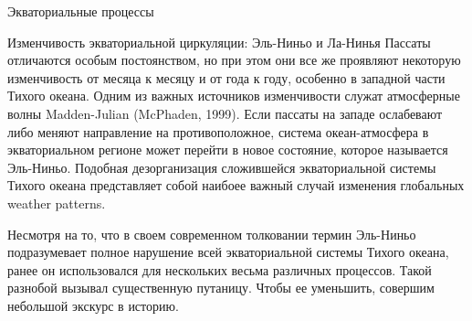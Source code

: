 \begin{chapter}{Экваториальные процессы}
\begin{section}{Изменчивость экваториальной циркуляции: Эль-Ниньо и Ла-Нинья}
%
%
Пассаты отличаются особым постоянством, но при этом они все же проявляют
некоторую изменчивость от месяца к месяцу и от года к году, особенно в западной
части Тихого океана. Одним из важных источников изменчивости служат атмосферные 
волны Madden-Julian (McPhaden, 1999). Если пассаты на западе ослабевают либо
меняют направление на противоположное, система океан-атмосфера в 
экваториальном регионе может перейти в новое состояние, которое называется
Эль-Ниньо. Подобная дезорганизация сложившейся экваториальной системы Тихого 
океана представляет собой наибоее важный случай изменения глобальных
weather patterns.
%

Несмотря на то, что в своем современном толковании термин Эль-Ниньо 
подразумевает полное нарушение всей экваториальной системы Тихого океана, 
ранее он использовался для нескольких весьма различных процессов. Такой
разнобой вызывал существенную путаницу. Чтобы ее уменьшить, совершим 
небольшой экскурс в историю.
%


\end{section}
\end{chapter}
